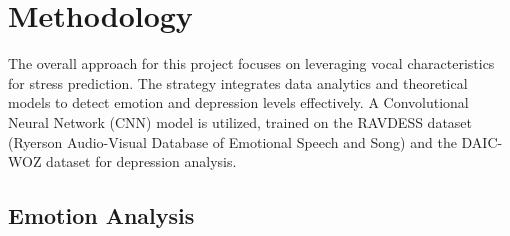 
\chapter{Methodology}

The overall approach for this project focuses on leveraging vocal characteristics for stress prediction. The strategy integrates data analytics and theoretical models to detect emotion and depression levels effectively. A Convolutional Neural Network (CNN) model is utilized, trained on the RAVDESS dataset (Ryerson Audio-Visual Database of Emotional Speech and Song) and the DAIC-WOZ dataset for depression analysis.

\section{Emotion Analysis}

